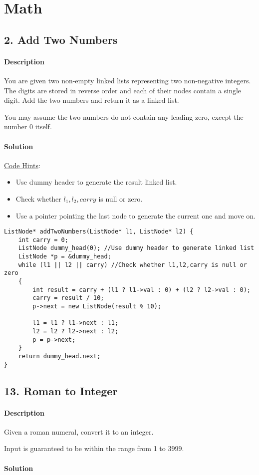 \section{Math}

\subsection{2. Add Two Numbers}

\paragraph{Description}

You are given two non-empty linked lists representing two non-negative integers. The digits are stored in reverse order and each of their nodes contain a single digit. Add the two numbers and return it as a linked list.

You may assume the two numbers do not contain any leading zero, except the number 0 itself.

\paragraph{Solution}

\underline{Code Hints}:
\begin{itemize}
    \item Use dummy header to generate the result linked list.
    \item Check whether $l_1,l_2,carry$ is null or zero.
    \item Use a pointer pointing the last node to generate the current one and move on.
\end{itemize}

\begin{verbatim}
ListNode* addTwoNumbers(ListNode* l1, ListNode* l2) {
    int carry = 0;
    ListNode dummy_head(0); //Use dummy header to generate linked list
    ListNode *p = &dummy_head;
    while (l1 || l2 || carry) //Check whether l1,l2,carry is null or zero
    {
        int result = carry + (l1 ? l1->val : 0) + (l2 ? l2->val : 0);
        carry = result / 10;
        p->next = new ListNode(result % 10);
        
        l1 = l1 ? l1->next : l1;
        l2 = l2 ? l2->next : l2;
        p = p->next;
    }
    return dummy_head.next;
}
\end{verbatim}

\subsection{13. Roman to Integer}

\paragraph{Description}

Given a roman numeral, convert it to an integer.

Input is guaranteed to be within the range from 1 to 3999.

\paragraph{Solution}

